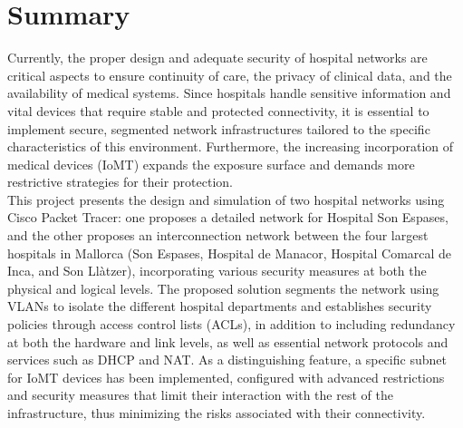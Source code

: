 
\chapter{Summary}
Currently, the proper design and adequate security of hospital networks are critical aspects to ensure continuity of care, the privacy of clinical data, and the availability 
of medical systems. Since hospitals handle sensitive information and vital devices that require stable and protected connectivity, it is essential to implement secure, 
segmented network infrastructures tailored to the specific characteristics of this environment. Furthermore, the increasing incorporation of medical devices (IoMT) expands 
the exposure surface and demands more restrictive strategies for their protection. \\

This project presents the design and simulation of two hospital networks using Cisco Packet Tracer: one proposes a detailed network for Hospital Son Espases, and the other 
proposes an interconnection network between the four largest hospitals in Mallorca (Son Espases, Hospital de Manacor, Hospital Comarcal de Inca, and Son Llàtzer), incorporating 
various security measures at both the physical and logical levels. The proposed solution segments the network using VLANs to isolate the different hospital departments and 
establishes security policies through access control lists (ACLs), in addition to including redundancy at both the hardware and link levels, as well as essential network 
protocols and services such as DHCP and NAT. As a distinguishing feature, a specific subnet for IoMT devices has been implemented, configured with advanced restrictions and 
security measures that limit their interaction with the rest of the infrastructure, thus minimizing the risks associated with their connectivity.